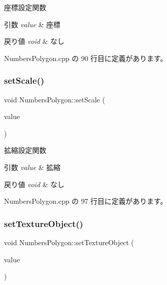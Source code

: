 座標設定関数 


\begin{DoxyParams}{引数}
{\em value} & 座標 \\
\hline
\end{DoxyParams}

\begin{DoxyRetVals}{戻り値}
{\em void} & なし \\
\hline
\end{DoxyRetVals}


 Numbers\+Polygon.\+cpp の 90 行目に定義があります。

\mbox{\label{class_numbers_polygon_a04dd7fc8b3b20ea9c8dd5027dcf894c2}} 
\subsubsection{\texorpdfstring{set\+Scale()}{setScale()}}
{\footnotesize\ttfamily void Numbers\+Polygon\+::set\+Scale (\begin{DoxyParamCaption}\item[{\mbox{\hyperlink{_vector3_d_8h_a5ef6e95dfc5f9d3820b71772d99bbc25}{Vec2}}}]{value }\end{DoxyParamCaption})}



拡縮設定関数 


\begin{DoxyParams}{引数}
{\em value} & 拡縮 \\
\hline
\end{DoxyParams}

\begin{DoxyRetVals}{戻り値}
{\em void} & なし \\
\hline
\end{DoxyRetVals}


 Numbers\+Polygon.\+cpp の 97 行目に定義があります。

\mbox{\label{class_numbers_polygon_a154e8d7c2b9e6d08e96887c847ae3539}} 
\subsubsection{\texorpdfstring{set\+Texture\+Object()}{setTextureObject()}}
{\footnotesize\ttfamily void Numbers\+Polygon\+::set\+Texture\+Object (\begin{DoxyParamCaption}\item[{\mbox{\hyperlink{class_texture_object}{Texture\+Object}} $\ast$}]{value }\end{DoxyParamCaption})}



